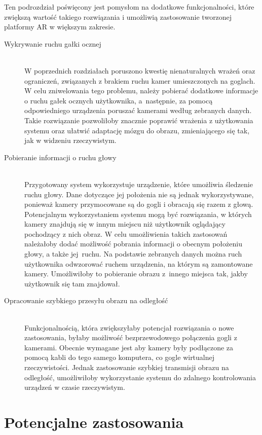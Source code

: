 \documentclass[a4paper,11pt,twoside]{report}
\theoremstyle{definition}
\begin{document}
Ten podrozdział poświęcony jest pomysłom na dodatkowe funkcjonalności, które zwiększą wartość takiego rozwiązania i umożliwią zastosowanie tworzonej platformy AR w większym zakresie.

\begin{description}
\item [Wykrywanie ruchu gałki ocznej] \hfill \\
W poprzednich rozdziałach poruszono kwestię nienaturalnych wrażeń oraz ograniczeń, związanych z brakiem ruchu kamer umieszczonych na goglach. W celu zniwelowania tego problemu, należy pobierać dodatkowe informacje o ruchu gałek ocznych użytkownika, a~następnie, za pomocą odpowiedniego urządzenia poruszać kamerami według zebranych danych. Takie rozwiązanie pozwoliłoby znacznie poprawić wrażenia z użytkowania systemu oraz ułatwić adaptację mózgu do obrazu, zmieniającego się tak, jak w widzeniu rzeczywistym.

\item [Pobieranie informacji o ruchu głowy] \hfill \\
Przygotowany system wykorzystuje urządzenie, które umożliwia śledzenie ruchu głowy. Dane dotyczące jej położenia nie są jednak wykorzystywane, ponieważ kamery przymocowane są do gogli i obracają się razem z głową. Potencjalnym wykorzystaniem systemu mogą być rozwiązania, w których kamery znajdują się w innym miejscu niż użytkownik oglądający pochodzący z nich obraz. W celu umożliwienia takich zastosowań należałoby dodać możliwość pobrania informacji o obecnym położeniu głowy, a także jej~ruchu. Na podstawie zebranych danych można ruch użytkownika odwzorować ruchem urządzenia, na którym są zamontowane kamery. Umożliwiłoby to pobieranie obrazu z~innego miejsca tak, jakby użytkownik się tam znajdował.

\item [Opracowanie szybkiego przesyłu obrazu na odległość] \hfill \\
Funkcjonalnością, która zwiększyłaby potencjał rozwiązania o nowe zastosowania, byłaby możliwość bezprzewodowego połączenia gogli z kamerami. Obecnie wymagane jest aby kamery były podłączone za pomocą kabli do tego samego komputera, co gogle wirtualnej rzeczywistości. Jednak zastosowanie szybkiej transmisji obrazu na odległość, umożliwiłoby wykorzystanie systemu do zdalnego kontrolowania urządzeń w czasie rzeczywistym.

\end{description}

\section{Potencjalne zastosowania}
\end{document}
